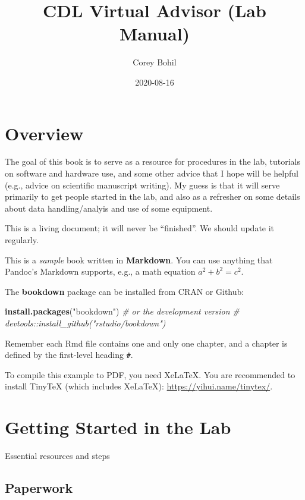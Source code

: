\documentclass[
]{book}
\title{CDL Virtual Advisor (Lab Manual)}
\author{Corey Bohil}
\date{2020-08-16}
\newenvironment{Shaded}{\begin{snugshade}}{\end{snugshade}}
\newcommand{\CommentTok}[1]{\textcolor[rgb]{0.56,0.35,0.01}{\textit{#1}}}
\newcommand{\KeywordTok}[1]{\textcolor[rgb]{0.13,0.29,0.53}{\textbf{#1}}}
\newcommand{\NormalTok}[1]{#1}
\newcommand{\StringTok}[1]{\textcolor[rgb]{0.31,0.60,0.02}{#1}}
\begin{document}
\maketitle

{
\setcounter{tocdepth}{1}
\tableofcontents
}
\hypertarget{overview}{%
\chapter{Overview}\label{overview}}

The goal of this book is to serve as a resource for procedures in the lab, tutorials on software and hardware use, and some other advice that I hope will be helpful (e.g., advice on scientific manuscript writing). My guess is that it will serve primarily to get people started in the lab, and also as a refresher on some details about data handling/analyis and use of some equipment.

This is a living document; it will never be ``finished''. We should update it regularly.

This is a \emph{sample} book written in \textbf{Markdown}. You can use anything that Pandoc's Markdown supports, e.g., a math equation \(a^2 + b^2 = c^2\).

The \textbf{bookdown} package can be installed from CRAN or Github:

\begin{Shaded}
\begin{Highlighting}[]
\KeywordTok{install.packages}\NormalTok{(}\StringTok{"bookdown"}\NormalTok{)}
\CommentTok{# or the development version}
\CommentTok{# devtools::install_github("rstudio/bookdown")}
\end{Highlighting}
\end{Shaded}

Remember each Rmd file contains one and only one chapter, and a chapter is defined by the first-level heading \texttt{\#}.

To compile this example to PDF, you need XeLaTeX. You are recommended to install TinyTeX (which includes XeLaTeX): \url{https://yihui.name/tinytex/}.

\hypertarget{getting_started}{%
\chapter{Getting Started in the Lab}\label{getting_started}}

Essential resources and steps

\hypertarget{paperwork}{%
\section{Paperwork}\label{paperwork}}
\end{document}
